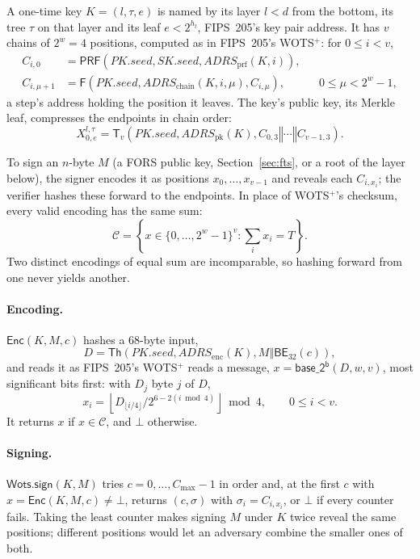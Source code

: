 \documentclass[11pt]{article}
\newcommand{\Th}{\mathsf{Th}}
\newcommand{\PRF}{\mathsf{PRF}}
\newcommand{\Enc}{\mathsf{Enc}}
\newcommand{\BE}{\mathsf{BE}}
\newcommand{\basetwo}{\mathsf{base\_2^b}}
\newcommand{\concat}{\mathbin\Vert}
\newcommand{\pkseed}{\mathit{PK.seed}}
\newcommand{\skseed}{\mathit{SK.seed}}
\newcommand{\addr}{\mathit{ADRS}}
\newcommand{\cmax}{C_{\max}}
\newcommand{\WotsSign}{\mathsf{Wots.sign}}
\begin{document}
A one-time key $K=(l,\tau,e)$ is named by its layer $l<d$ from the bottom, its tree $\tau$ on that layer and its leaf $e<2^{h_l}$, FIPS~205's key pair address. It has $v$ chains of $2^w=4$ positions, computed as in FIPS~205's WOTS$^+$: for $0\leq i<v$,
\[
\begin{aligned}
  C_{i,0}&=\PRF\!\left(\pkseed,\skseed,\addr_{\mathrm{prf}}(K,i)\right),\\
  C_{i,\mu+1}&=\mathsf F\!\left(\pkseed,\addr_{\mathrm{chain}}(K,i,\mu),C_{i,\mu}\right),
    &&0\leq\mu<2^w-1,
\end{aligned}
\]
a step's address holding the position it leaves. The key's public key, its Merkle leaf, compresses the endpoints in chain order:
\[
  X^{l,\tau}_{0,e}=\mathsf T_v\!\left(\pkseed,\addr_{\mathrm{pk}}(K),C_{0,3}\concat\cdots\concat C_{v-1,3}\right).
\]

To sign an $n$-byte $M$ (a FORS public key, Section~\ref{sec:fts}, or a root of the layer below), the signer encodes it as positions $x_0,\ldots,x_{v-1}$ and reveals each $C_{i,x_i}$; the verifier hashes these forward to the endpoints. In place of WOTS$^+$'s checksum, every valid encoding has the same sum:
\[
  \mathcal C=\left\{x\in\{0,\ldots,2^w-1\}^{v}:\textstyle\sum_{i}x_i=T\right\}.
\]
Two distinct encodings of equal sum are incomparable, so hashing forward from one never yields another.

\paragraph{Encoding.}
$\Enc(K,M,c)$ hashes a 68-byte input,
\[
  D=\Th\!\left(\pkseed,\addr_{\mathrm{enc}}(K),M\concat\BE_{32}(c)\right),
\]
and reads it as FIPS~205's WOTS$^+$ reads a message, $x=\basetwo(D,w,v)$, most significant bits first: with $D_j$ byte $j$ of $D$,
\[
  x_i=\left\lfloor D_{\lfloor i/4\rfloor}/2^{6-2(i\bmod4)}\right\rfloor\bmod 4,\qquad 0\leq i<v.
\]
It returns $x$ if $x\in\mathcal C$, and $\bot$ otherwise.

\paragraph{Signing.}
$\WotsSign(K,M)$ tries $c=0,\ldots,\cmax-1$ in order and, at the first $c$ with $x=\Enc(K,M,c)\neq\bot$, returns $(c,\sigma)$ with $\sigma_i=C_{i,x_i}$, or $\bot$ if every counter fails. Taking the least counter makes signing $M$ under $K$ twice reveal the same positions; different positions would let an adversary combine the smaller ones of both.
\end{document}
